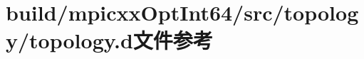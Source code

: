 \hypertarget{build_2mpicxxOptInt64_2src_2topology_2topology_8d}{
\section{build/mpicxxOptInt64/src/topology/topology.d文件参考}
\label{build_2mpicxxOptInt64_2src_2topology_2topology_8d}
}
